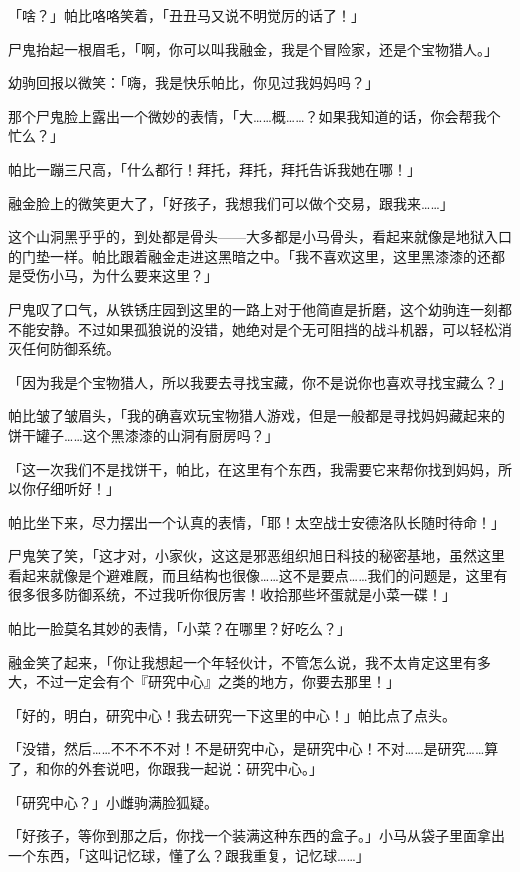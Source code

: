 「啥？」帕比咯咯笑着，「丑丑马又说不明觉厉的话了！」

尸鬼抬起一根眉毛，「啊，你可以叫我融金，我是个冒险家，还是个宝物猎人。」

幼驹回报以微笑：「嗨，我是快乐帕比，你见过我妈妈吗？」

那个尸鬼脸上露出一个微妙的表情，「大……概……？如果我知道的话，你会帮我个忙么？」

帕比一蹦三尺高，「什么都行！拜托，拜托，拜托告诉我她在哪！」

融金脸上的微笑更大了，「好孩子，我想我们可以做个交易，跟我来……」

\horizonline


这个山洞黑乎乎的，到处都是骨头——大多都是小马骨头，看起来就像是地狱入口的门垫一样。帕比跟着融金走进这黑暗之中。「我不喜欢这里，这里黑漆漆的还都是受伤小马，为什么要来这里？」

尸鬼叹了口气，从铁锈庄园到这里的一路上对于他简直是折磨，这个幼驹连一刻都不能安静。不过如果孤狼说的没错，她绝对是个无可阻挡的战斗机器，可以轻松消灭任何防御系统。

「因为我是个宝物猎人，所以我要去寻找宝藏，你不是说你也喜欢寻找宝藏么？」

帕比皱了皱眉头，「我的确喜欢玩宝物猎人游戏，但是一般都是寻找妈妈藏起来的饼干罐子……这个黑漆漆的山洞有厨房吗？」

「这一次我们不是找饼干，帕比，在这里有个东西，我需要它来帮你找到妈妈，所以你仔细听好！」

帕比坐下来，尽力摆出一个认真的表情，「耶！太空战士安德洛队长随时待命！」

尸鬼笑了笑，「这才对，小家伙，这这是邪恶组织旭日科技的秘密基地，虽然这里看起来就像是个避难厩，而且结构也很像……这不是要点……我们的问题是，这里有很多很多防御系统，不过我听你很厉害！收拾那些坏蛋就是小菜一碟！」

帕比一脸莫名其妙的表情，「小菜？在哪里？好吃么？」

融金笑了起来，「你让我想起一个年轻伙计，不管怎么说，我不太肯定这里有多大，不过一定会有个『研究中心』之类的地方，你要去那里！」

「好的，明白，研究中心！我去研究一下这里的中心！」帕比点了点头。

「没错，然后……不不不不对！不是研究中心，是研究中心！不对……是研究……算了，和你的外套说吧，你跟我一起说：研究中心。」

「研究中心？」小雌驹满脸狐疑。

「好孩子，等你到那之后，你找一个装满这种东西的盒子。」小马从袋子里面拿出一个东西，「这叫记忆球，懂了么？跟我重复，记忆球……」

